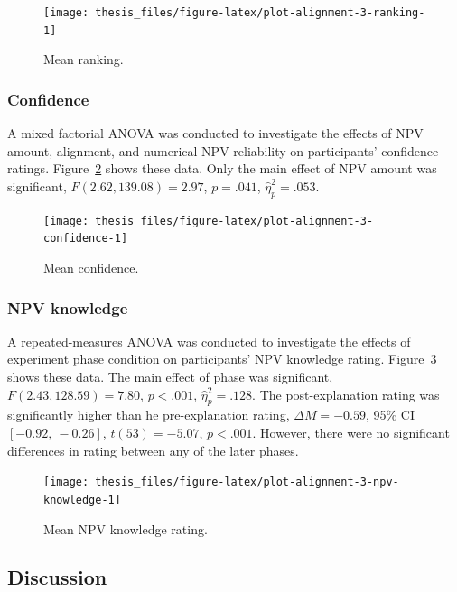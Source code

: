 \documentclass[a4paper, nobind, dvipsnames]{templates/ociamthesis}
\theoremstyle{definition}
\theoremstyle{definition}
\theoremstyle{definition}
\theoremstyle{definition}
\theoremstyle{remark}
\begin{document}
\begin{figure}
\texttt{[image: thesis\_files/figure-latex/plot-alignment-3-ranking-1]} \caption{Mean ranking.}\label{fig:plot-alignment-3-ranking}
\end{figure}

\hypertarget{confidence-1}{%
\subsubsection{Confidence}\label{confidence-1}}

A mixed factorial ANOVA was conducted to investigate the effects of NPV amount,
alignment, and numerical NPV reliability on participants' confidence ratings.
Figure~\ref{fig:plot-alignment-3-confidence} shows these data. Only the main
effect of NPV amount was significant,
\(F(2.62, 139.08) = 2.97\), \(p = .041\), \(\hat{\eta}^2_p = .053\).



\begin{figure}
\texttt{[image: thesis\_files/figure-latex/plot-alignment-3-confidence-1]} \caption{Mean confidence.}\label{fig:plot-alignment-3-confidence}
\end{figure}

\hypertarget{npv-knowledge}{%
\subsubsection{NPV knowledge}\label{npv-knowledge}}

A repeated-measures ANOVA was conducted to investigate the effects of experiment
phase condition on participants' NPV knowledge rating.
Figure~\ref{fig:plot-alignment-3-npv-knowledge} shows these data. The main
effect of phase was significant, \(F(2.43, 128.59) = 7.80\), \(p < .001\), \(\hat{\eta}^2_p = .128\).
The post-explanation rating was significantly higher than he pre-explanation
rating,
\(\Delta M = -0.59\), 95\% CI \([-0.92,~-0.26]\), \(t(53) = -5.07\), \(p < .001\). However, there were no significant
differences in rating between any of the later phases.



\begin{figure}
\texttt{[image: thesis\_files/figure-latex/plot-alignment-3-npv-knowledge-1]} \caption{Mean NPV knowledge rating.}\label{fig:plot-alignment-3-npv-knowledge}
\end{figure}

\hypertarget{discussion-10}{%
\subsection{Discussion}\label{discussion-10}}
\end{document}
